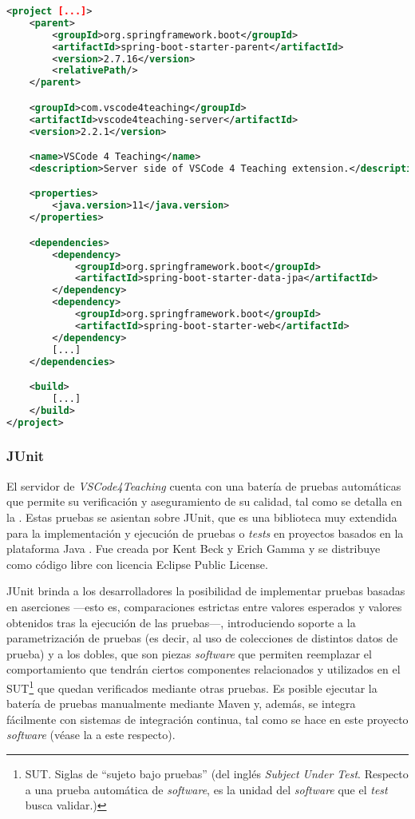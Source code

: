 \begin{lstlisting}[language=XML,caption={Fragmento adaptado del fichero para la configuración de Maven aplicado en el servidor del proyecto (\texttt{pom.xml}).},label=cod:pomServidor]
<project [...]>
    <parent>
        <groupId>org.springframework.boot</groupId>
        <artifactId>spring-boot-starter-parent</artifactId>
        <version>2.7.16</version>
        <relativePath/>
    </parent>

    <groupId>com.vscode4teaching</groupId>
    <artifactId>vscode4teaching-server</artifactId>
    <version>2.2.1</version>

    <name>VSCode 4 Teaching</name>
    <description>Server side of VSCode 4 Teaching extension.</description>

    <properties>
        <java.version>11</java.version>
    </properties>

    <dependencies>
        <dependency>
            <groupId>org.springframework.boot</groupId>
            <artifactId>spring-boot-starter-data-jpa</artifactId>
        </dependency>
        <dependency>
            <groupId>org.springframework.boot</groupId>
            <artifactId>spring-boot-starter-web</artifactId>
        </dependency>
        [...]
    </dependencies>

    <build>
        [...]
    </build>
</project>
\end{lstlisting}

\subsubsection{JUnit}
\label{subsec:tecJUnit}
El servidor de \textit{VSCode4Teaching} cuenta con una batería de pruebas automáticas que permite su verificación y aseguramiento de su calidad, tal como se detalla en la . Estas pruebas se asientan sobre JUnit, que es una biblioteca muy extendida para la implementación y ejecución de pruebas o \textit{tests} en proyectos basados en la plataforma Java \cite{JUnit}. Fue creada por Kent Beck y Erich Gamma y se distribuye como código libre con licencia Eclipse Public License.

JUnit brinda a los desarrolladores la posibilidad de implementar pruebas basadas en aserciones ---esto es, comparaciones estrictas entre valores esperados y valores obtenidos tras la ejecución de las pruebas---, introduciendo soporte a la parametrización de pruebas (es decir, al uso de colecciones de distintos datos de prueba) y a los dobles, que son piezas \textit{software} que permiten reemplazar el comportamiento que tendrán ciertos componentes relacionados y utilizados en el SUT\footnote{SUT. Siglas de ``sujeto bajo pruebas'' (del inglés \textit{Subject Under Test}. Respecto a una prueba automática de \textit{software}, es la unidad del \textit{software} que el \textit{test} busca validar.)} que quedan verificados mediante otras pruebas. Es posible ejecutar la batería de pruebas manualmente mediante Maven y, además, se integra fácilmente con sistemas de integración continua, tal como se hace en este proyecto \textit{software} (véase la  a este respecto).
